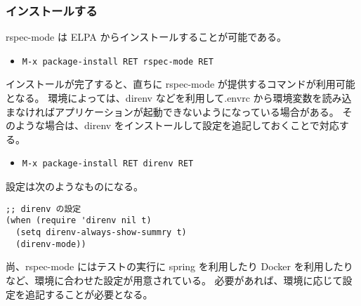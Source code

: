 \subsubsection{インストールする}
rspec-mode は ELPA からインストールすることが可能である。
\begin{itemize}\setlength{\leftskip}{-1.00zw}%
\item[] \texttt{M-x package-install RET rspec-mode RET}
\end{itemize}
インストールが完了すると、直ちに rspec-mode が提供するコマンドが利用可能となる。
環境によっては、direnv などを利用して.envrc から環境変数を読み込まなければアプリケーションが起動できないようになっている場合がある。
そのような場合は、direnv をインストールして設定を追記しておくことで対応する。
\begin{itemize}\setlength{\leftskip}{-1.00zw}%
\item[] \texttt{M-x package-install RET direnv RET}
\end{itemize}
設定は次のようなものになる。
\begin{mdframed}[roundcorner=0.50zw,leftmargin=3.00zw,rightmargin=3.00zw,skipabove=0.40zw,skipbelow=0.40zw,innertopmargin=4.00pt,innerbottommargin=4.00pt,innerleftmargin=5.00pt,innerrightmargin=5.00pt,linecolor=gray!020,linewidth=0.50pt,backgroundcolor=gray!20]
\begin{verbatim}
;; direnv の設定
(when (require 'direnv nil t)
  (setq direnv-always-show-summry t)
  (direnv-mode))
\end{verbatim}
\end{mdframed}
尚、rspec-mode にはテストの実行に spring を利用したり Docker を利用したりなど、環境に合わせた設定が用意されている。
必要があれば、環境に応じて設定を追記することが必要となる。
